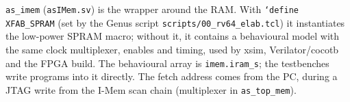 \texttt{as\_imem} (\texttt{asIMem.sv}) is the wrapper around the RAM. With
\texttt{`define XFAB\_SPRAM} (set by the Genus script
\texttt{scripts/00\_rv64\_elab.tcl}) it instantiates the low-power SPRAM macro;
without it, it contains a behavioural model with the same clock multiplexer,
enables and timing, used by xsim, Verilator/cocotb and the FPGA build. The
behavioural array is \texttt{imem.iram\_s}; the testbenches write programs
into it directly. The fetch address comes from the PC, during a JTAG write
from the I-Mem scan chain (multiplexer in \texttt{as\_top\_mem}).
